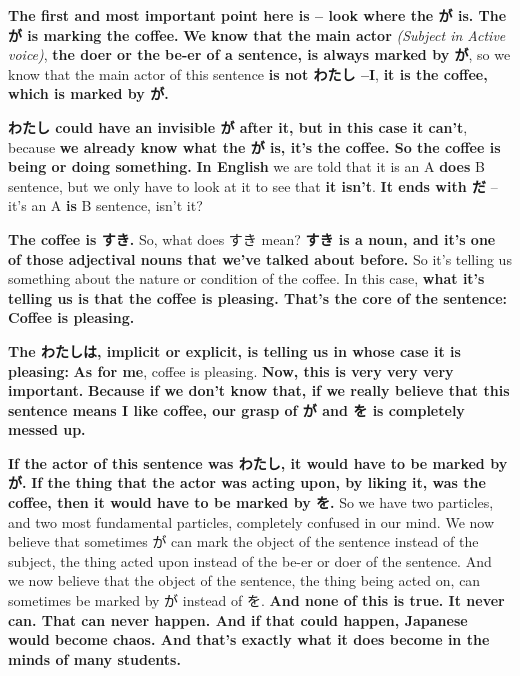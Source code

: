 \thinrule

{\bf The first and most important point here is -- look where the が is. The が is marking the coffee.} {\bf We know that the main actor} {\em (Subject in Active voice)}, {\bf the doer or the be-er of a sentence, is always marked by が}, so we know that the main actor of this sentence {\bf is not わたし --I}, {\bf it is the coffee, which is marked by が.}

{}

{\bf わたし could have an invisible が after it, but in this case it can't}, because {\bf we already know what the が is, it's the coffee. So the coffee is being or doing something.} {\bf In English} we are told that it is an A {\bf does} B sentence, but we only have to look at it to see that {\bf it isn't}. {\bf It ends with だ} -- it's an A {\bf is} B sentence, isn't it?

{}

{\bf The coffee is すき.} So, what does すき mean? {\bf すき is a noun, and it's one of those adjectival nouns that we've talked about before.} So it's telling us something about the nature or condition of the coffee. In this case, {\bf what it's telling us is that the coffee is pleasing. That's the core of the sentence: Coffee is pleasing.}

{}

{\bf The わたしは, implicit or explicit, is telling us in whose case it is pleasing:} {\bf As for me}, coffee is pleasing. {\bf Now, this is very very very important.} {\bf Because if we don't know that, if we really believe that this sentence means I like coffee, our grasp of が and を is completely messed up.}

\thinrule

{\bf If the actor of this sentence was わたし, it would have to be marked by が.} {\bf If the thing that the actor was acting upon, by liking it, was the coffee, then it would have to be marked by を.} So we have two particles, and two most fundamental particles, completely confused in our mind. We now believe that sometimes が can mark the object of the sentence instead of the subject, the thing acted upon instead of the be-er or doer of the sentence. And we now believe that the object of the sentence, the thing being acted on, can sometimes be marked by が instead of を. {\bf And none of this is true. It never can. That can never happen. And if that could happen, Japanese would become chaos. And that's exactly what it does become in the minds of many students.}

